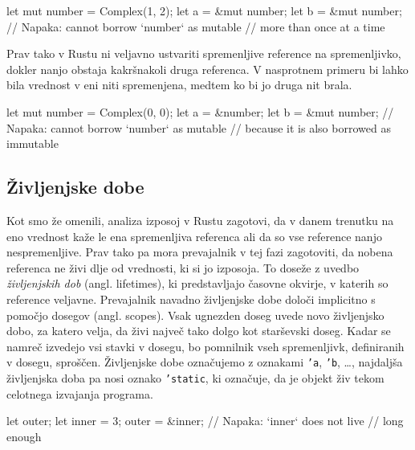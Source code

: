 \begin{rust-failure}
let mut number = Complex(1, 2);
let a = &mut number;
let b = &mut number;  // Napaka: cannot borrow `number` as mutable
                      // more than once at a time
\end{rust-failure}

Prav tako v Rustu ni veljavno ustvariti spremenljive reference na spremenljivko, dokler nanjo obstaja kakršnakoli druga referenca. V nasprotnem primeru bi lahko bila vrednost v eni niti spremenjena, medtem ko bi jo druga nit brala.

\begin{rust-failure}
let mut number = Complex(0, 0);
let a = &number;
let b = &mut number;  // Napaka: cannot borrow `number` as mutable
                      // because it is also borrowed as immutable
\end{rust-failure}

%

\subsection{Življenjske dobe}

Kot smo že omenili, analiza izposoj v Rustu zagotovi, da v danem trenutku na eno vrednost kaže le ena spremenljiva referenca ali da so vse reference nanjo nespremenljive. Prav tako pa mora prevajalnik v tej fazi zagotoviti, da nobena referenca ne živi dlje od vrednosti, ki si jo izposoja. To doseže z uvedbo \textit{življenjskih dob} (angl. lifetimes), ki predstavljajo časovne okvirje, v katerih so reference veljavne. Prevajalnik navadno življenjske dobe določi implicitno s pomočjo dosegov (angl. scopes). Vsak ugnezden doseg uvede novo življenjsko dobo, za katero velja, da živi največ tako dolgo kot starševski doseg. Kadar se namreč izvedejo vsi stavki v dosegu, bo pomnilnik vseh spremenljivk, definiranih v dosegu, sproščen. Življenjske dobe označujemo z oznakami \texttt{'a}, \texttt{'b}, \dots, najdaljša življenjska doba pa nosi oznako \texttt{'static}, ki označuje, da je objekt živ tekom celotnega izvajanja programa.

\begin{rust-failure}
let outer;
{
    let inner = 3;
    outer = &inner;  // Napaka: `inner` does not live
                     // long enough
}
\end{rust-failure}

